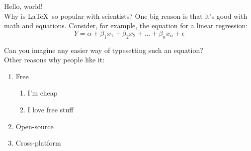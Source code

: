 \documentclass{article}
\begin{document}
Hello, world! \\

Why is \LaTeX\ so popular with scientists? One big reason is that it's good with math and equations. Consider, for example, the equation for a linear regression: $$Y = \alpha + \beta_1x_1 + \beta_2x_2 + \ldots + \beta_nx_n + \epsilon$$

Can you imagine any easier way of typesetting such an equation? \\

\noindent
Other reasons why people like it:
\begin{enumerate}
	\item{Free}
	\begin{enumerate}
			\item{I'm cheap}
			\item{I love free stuff}
	\end{enumerate}
	\item{Open-source}
	\item{Cross-platform}
\end{enumerate}
	
\end{document}
